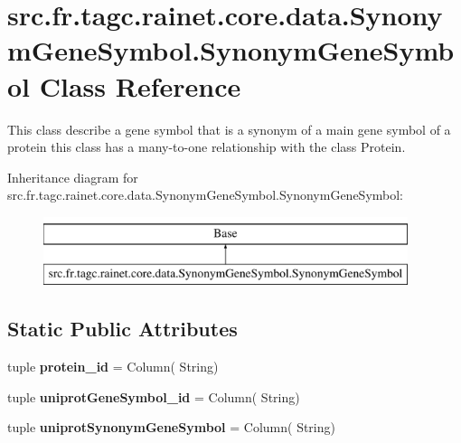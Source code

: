 \hypertarget{classsrc_1_1fr_1_1tagc_1_1rainet_1_1core_1_1data_1_1SynonymGeneSymbol_1_1SynonymGeneSymbol}{\section{src.\-fr.\-tagc.\-rainet.\-core.\-data.\-Synonym\-Gene\-Symbol.\-Synonym\-Gene\-Symbol Class Reference}
\label{classsrc_1_1fr_1_1tagc_1_1rainet_1_1core_1_1data_1_1SynonymGeneSymbol_1_1SynonymGeneSymbol}
}


This class describe a gene symbol that is a synonym of a main gene symbol of a protein this class has a many-\/to-\/one relationship with the class Protein.  


Inheritance diagram for src.\-fr.\-tagc.\-rainet.\-core.\-data.\-Synonym\-Gene\-Symbol.\-Synonym\-Gene\-Symbol\-:\begin{figure}[H]
\begin{center}
\leavevmode
\includegraphics[height=2.000000cm]{classsrc_1_1fr_1_1tagc_1_1rainet_1_1core_1_1data_1_1SynonymGeneSymbol_1_1SynonymGeneSymbol}
\end{center}
\end{figure}
\subsection*{Static Public Attributes}
\begin{DoxyCompactItemize}
\item 
\hypertarget{classsrc_1_1fr_1_1tagc_1_1rainet_1_1core_1_1data_1_1SynonymGeneSymbol_1_1SynonymGeneSymbol_a60b0caa4ff16ab1c362f6dffdfdf2f14}{tuple {\bfseries protein\-\_\-id} = Column( String)}\label{classsrc_1_1fr_1_1tagc_1_1rainet_1_1core_1_1data_1_1SynonymGeneSymbol_1_1SynonymGeneSymbol_a60b0caa4ff16ab1c362f6dffdfdf2f14}

\item 
\hypertarget{classsrc_1_1fr_1_1tagc_1_1rainet_1_1core_1_1data_1_1SynonymGeneSymbol_1_1SynonymGeneSymbol_af9b371f12a6e073fdbeed3ddade8e9af}{tuple {\bfseries uniprot\-Gene\-Symbol\-\_\-id} = Column( String)}\label{classsrc_1_1fr_1_1tagc_1_1rainet_1_1core_1_1data_1_1SynonymGeneSymbol_1_1SynonymGeneSymbol_af9b371f12a6e073fdbeed3ddade8e9af}

\item 
\hypertarget{classsrc_1_1fr_1_1tagc_1_1rainet_1_1core_1_1data_1_1SynonymGeneSymbol_1_1SynonymGeneSymbol_af2f88f4734ccf6bb487a9eb414d12691}{tuple {\bfseries uniprot\-Synonym\-Gene\-Symbol} = Column( String)}\label{classsrc_1_1fr_1_1tagc_1_1rainet_1_1core_1_1data_1_1SynonymGeneSymbol_1_1SynonymGeneSymbol_af2f88f4734ccf6bb487a9eb414d12691}

\end{DoxyCompactItemize}


